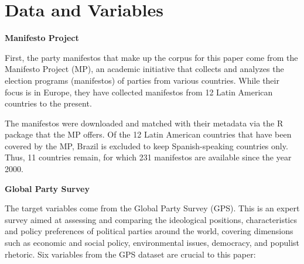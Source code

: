 \documentclass[12pt,letterpaper]{article}
\begin{document}
\section*{Data and Variables} 

\vspace{.25cm}
\noindent \textbf{Manifesto Project}
\vspace{.25cm}

\noindent First, the party manifestos that make up the corpus for this paper come from the Manifesto Project (MP), an academic initiative that collects and analyzes the election programs (manifestos) of parties from various countries. While their focus is in Europe, they have collected manifestos from 12 Latin American countries to the present. 

The manifestos were downloaded and matched with their metadata via the R package that the MP offers. Of the 12 Latin American countries that have been covered by the MP, Brazil is excluded to keep Spanish-speaking countries only. Thus, 11 countries remain, for which 231 manifestos are available since the year 2000. 

\vspace{.25cm}
\noindent \textbf{Global Party Survey}
\vspace{.25cm}

\noindent The target variables come from the Global Party Survey (GPS). This is an expert survey aimed at assessing and comparing the ideological positions, characteristics and policy preferences of political parties around the world, covering dimensions such as economic and social policy, environmental issues, democracy, and populist rhetoric. Six variables from the GPS dataset are crucial to this paper: 
\end{document}
